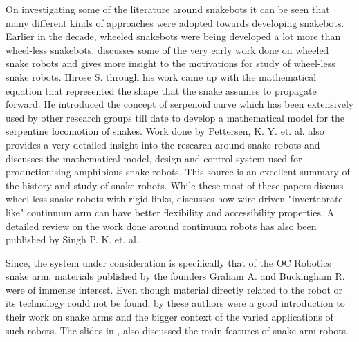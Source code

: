 \documentclass[a4paper,12pt]{report}
\begin{document}
On investigating some of the literature around snakebots it can be seen that many different kinds of approaches were adopted towards developing snakebots. Earlier in the decade, wheeled snakebots were being developed a lot more than wheel-less snakebots. \cite{saito2002modeling} discusses some of the very early work done on wheeled snake robots and gives more insight to the motivations for study of wheel-less snake robots. Hirose S. \cite{1521742} through his work came up with the mathematical equation that represented the shape that the snake assumes to propagate forward. He introduced the concept of serpenoid curve which has been extensively used by other research groups till date to develop a mathematical model for the serpentine locomotion of snakes. Work done by Pettersen, K. Y. et. al. \cite{pettersen2017snake} also provides a very detailed insight into the research around snake robots and discusses the mathematical model, design and control system used for productionising amphibious snake robots. This source is an excellent summary of the history and study of snake robots. While these most of these papers discuss wheel-less snake robots with rigid links, \cite{Zhou2018AnalysisOU} discusses how wire-driven "invertebrate like" continuum arm can have better flexibility and accessibility properties. A detailed review on the work done around continuum robots has also been published by Singh P. K. et. al.\cite{singh2014continuum}.


Since, the system under consideration is specifically that of the OC Robotics snake arm, materials published by the founders Graham A. and Buckingham R. were of immense interest. Even though material directly related to the robot or its technology could not be found, \cite{RN4,RN5,RN42} by these authors were a good introduction to their work on snake arms and the bigger context of the varied applications of such robots. The slides in \cite{RN42}, also discussed the main features of  snake arm robots.
\end{document}
